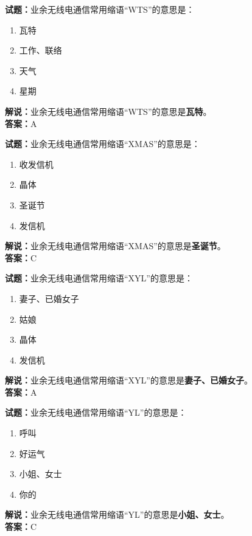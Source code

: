 \documentclass{ctexbook}
\begin{document}
\bigskip


\noindent\textbf{试题：}业余无线电通信常用缩语“WTS”的意思是：
\begin{enumerate}[leftmargin=3em]
\item 瓦特
\item 工作、联络
\item 天气
\item 星期
\end{enumerate}
\noindent\textbf{解说：}业余无线电通信常用缩语“WTS”的意思是\textbf{瓦特}。\\\noindent\textbf{答案：}A


\bigskip


\noindent\textbf{试题：}业余无线电通信常用缩语“XMAS”的意思是：
\begin{enumerate}[leftmargin=3em]
\item 收发信机
\item 晶体
\item 圣诞节
\item 发信机
\end{enumerate}
\noindent\textbf{解说：}业余无线电通信常用缩语“XMAS”的意思是\textbf{圣诞节}。\\\noindent\textbf{答案：}C




\bigskip


\noindent\textbf{试题：}业余无线电通信常用缩语“XYL”的意思是：
\begin{enumerate}[leftmargin=3em]
\item 妻子、已婚女子
\item 姑娘
\item 晶体
\item 发信机
\end{enumerate}
\noindent\textbf{解说：}业余无线电通信常用缩语“XYL”的意思是\textbf{妻子、已婚女子}。\\\noindent\textbf{答案：}A



\bigskip


\noindent\textbf{试题：}业余无线电通信常用缩语“YL”的意思是：
\begin{enumerate}[leftmargin=3em]
\item 呼叫
\item 好运气
\item 小姐、女士
\item 你的
\end{enumerate}
\noindent\textbf{解说：}业余无线电通信常用缩语“YL”的意思是\textbf{小姐、女士}。\\\noindent\textbf{答案：}C
\end{document}
